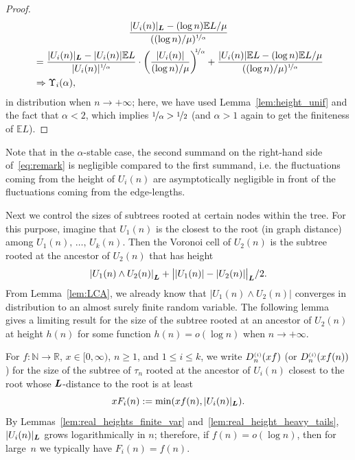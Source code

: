\documentclass[AHL,Unicode,longabstracts,published]{cedram}
\newcommand{\bs}{\ensuremath{\boldsymbol}}
\newcommand{\sss}{\ensuremath{\scriptscriptstyle}}
\newcommand{\bbE}{\mathbb{E}}
\newcommand{\bbN}{\mathbb{N}}
\newcommand{\bbR}{\mathbb{R}}
\begin{document}
\begin{proof}
\begin{multline}\label{eq:remark}
\frac{|U_i(n)|_{\bs L}-(\log n)\bbE L/\mu}{((\log n)/\mu)^{\nicefrac1\alpha}}\\
\begin{aligned}
&= \frac{|U_i(n)|_{\bs L}-|U_i(n)|\bbE L}{|U_i(n)|^{\nicefrac1\alpha}}
\cdot \bigg(\frac{|U_i(n)|}{(\log n)/\mu}\bigg)^{\!\!\nicefrac1\alpha} + \frac{|U_i(n)|\bbE L-(\log n)\bbE L/\mu}{((\log n)/\mu)^{\nicefrac1\alpha}}\\
&\Rightarrow\Upsilon_i(\alpha),
\end{aligned}
\end{multline}
in distribution when $n\to+\infty$; here, we have used Lemma~\ref{lem:height_unif} and the fact that $\alpha<2$, which implies $\nicefrac1\alpha>\nicefrac12$ (and $\alpha > 1$ again to get the finiteness of $\bbE L$).
\end{proof}

\begin{rema}
Note that in the $\alpha$-stable case, the second summand on the right-hand side of~\eqref{eq:remark} is negligible compared to the first summand, i.e. the fluctuations coming from the height of $U_i(n)$ are asymptotically negligible in front of the fluctuations coming from the edge-lengths.
\end{rema}

Next we control the sizes of subtrees rooted at certain nodes within the tree. For this purpose, imagine that $U_1(n)$ is the closest to the root (in graph distance) among $U_1(n), \,\ldots,\, U_k(n)$. Then the Voronoi cell of $U_2(n)$ is the subtree rooted at the ancestor of $U_2(n)$ that has height
\[
\left|U_1(n)\wedge U_2(n)\right|_{\bs L} + \big||U_1(n)|-|U_2(n)|\big|_{\bs L}/2.
\]
From Lemma~\ref{lem:LCA}, we already know that $|U_1(n)\wedge U_2(n)|$ converges in distribution to an almost surely finite random variable. The following lemma gives a limiting result for the size of the subtree rooted at an ancestor of $U_2(n)$ at height $h(n)$ for some function $h(n) = o(\log n)$ when $n\to+\infty$.

For $f\colon \bbN\to \bbR$, $x\in[0, \infty)$, $n\geq 1$, and $1\leq i\leq k$, we write $D^{\sss (i)}_n(xf)$ (or $D^{\sss (i)}_n(xf(n))$) for the size of the subtree of $\tau_n$ rooted at the ancestor of $U_i(n)$ closest to the root whose $\bs L$-distance to the root is at least
\begin{equation}\label{eq:Fdef}
xF_i(n):=\min(xf(n), |U_i(n)|_{\bs L}).
\end{equation}
By Lemmas~\ref{lem:real_heights_finite_var} and~\ref{lem:real_height_heavy_tails}, $|U_i(n)|_{\bs L}$ grows logarithmically in $n$; therefore, if $f(n)=o(\log n)$, then for large~$n$ we typically have $F_i(n)=f(n)$.
\end{document}
